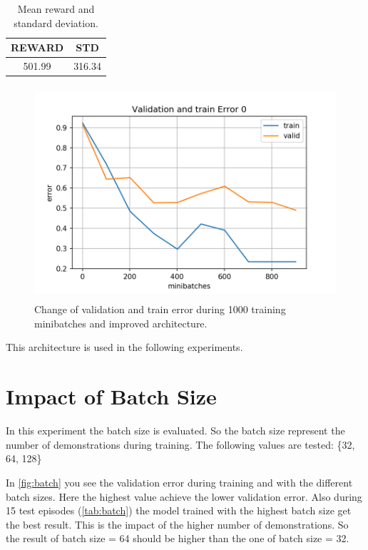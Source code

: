 \documentclass[a4paper,12pt]{article}
\begin{document}
\begin{table}[h] 
	\centering
	\begin{tabular}{|c | c|} 
		\hline
		\bfseries{REWARD} & \bfseries{STD} \\ 
		\hline
		501.99 & 316.34 \\  
		\hline
	\end{tabular}
	\caption{\label{tab:improved} Mean reward and standard deviation.}
\end{table}



\begin{figure}[H]
	\centering \includegraphics[width=11.70cm, height=7.9cm]{plots/valid_error_0.png}
	\caption{
		\label{fig:improved}
		Change of validation and train error during 1000 training minibatches and improved architecture.
	}
\end{figure}

This architecture is used in the following experiments.


\section{Impact of Batch Size}\label{batch}
In this experiment the batch size is evaluated. So the batch size represent the number of demonstrations during training. The following values are tested: \{32, 64, 128\}

In \autoref{fig:batch} you see the validation error during training and with the different batch sizes. Here the highest value achieve the lower validation error. Also during 15 test episodes (\autoref{tab:batch}) the model trained with the highest batch size get the best result. This is the impact of the higher number of demonstrations. So the result of batch size = 64 should be higher than the one of batch size = 32.
\end{document}
